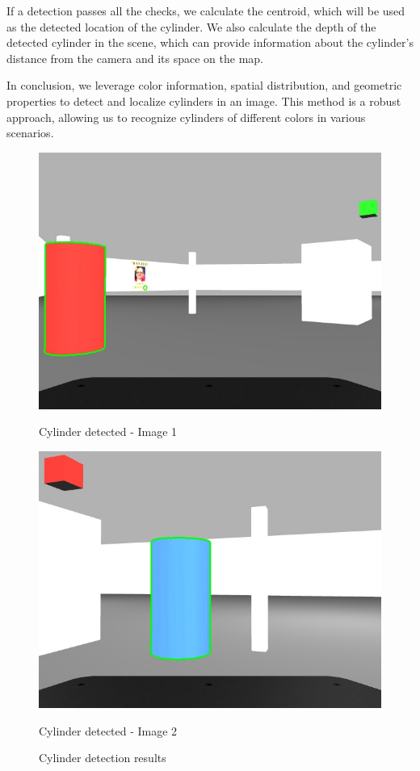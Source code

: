 \documentclass{article}
\begin{document}
If a detection passes all the checks, we calculate the centroid, which will be used as the detected location of the cylinder. We also calculate the depth of the detected cylinder in the scene, which can provide information about the cylinder's distance from the camera and its space on the map.

In conclusion, we leverage color information, spatial distribution, and geometric properties to detect and localize cylinders in an image. This method is a robust approach, allowing us to recognize cylinders of different colors in various scenarios.

\begin{figure}[htbp]
  \centering
  \begin{minipage}[b]{0.45\textwidth}
    \centering
    \includegraphics[width=\textwidth]{images/cylinder1.jpg}
    \caption{Cylinder detected - Image 1}
    \label{fig:cylinder1}
  \end{minipage}%
  \hfill
  \begin{minipage}[b]{0.45\textwidth}
    \centering
    \includegraphics[width=\textwidth]{images/cylinder2.jpg}
    \caption{Cylinder detected - Image 2}
    \label{fig:cylinder2}
  \end{minipage}
  \caption{Cylinder detection results}
  \label{fig:cylinders}
\end{figure}
\end{document}
